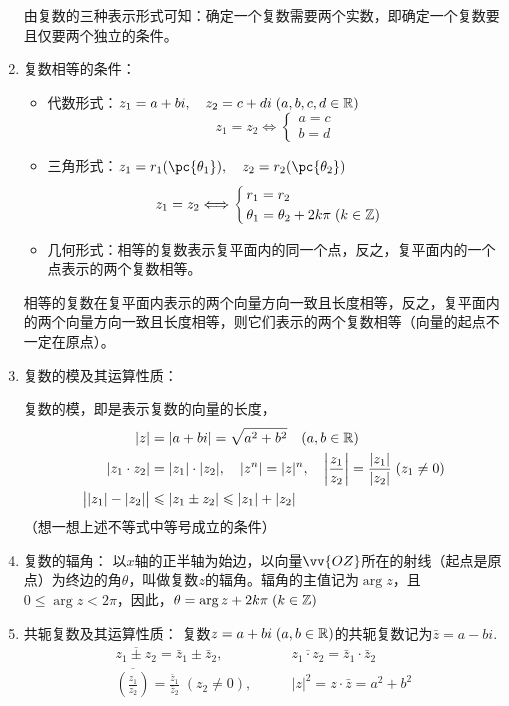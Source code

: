 \begin{enumerate}
由复数的三种表示形式可知：确定一个复数需要两个实数，即确定一个复数要且仅要两个独立的条件。
\item 复数相等的条件：
\begin{itemize}
    \item 代数形式：$z_1=a+bi,\quad z_2=c+di\; (a,b,c,d\in\mathbb{R})$
\[z_1=z_2\Longleftrightarrow \begin{cases}
    a=c\\ b=d
\end{cases}\]
\item 三角形式：$z_1=r_1(\pc{\theta_1}),\quad z_2=r_2(\pc{\theta_2})$
\[z_1=z_2\Longleftrightarrow \begin{cases}
    r_1=r_2\\ \theta_1=\theta_2+2k\pi\; (k\in\mathbb{Z})
\end{cases}\]
\item 几何形式：相等的复数表示复平面内的同一个点，反之，复平面内的一个点表示的两个复数相等。
\end{itemize}

相等的复数在复平面内表示的两个向量方向一致且长度相等，反之，复平面内的两个向量方向一致且长度相等，则它们表示的两个复数相等（向量的起点不一定在原点）。

\item 复数的模及其运算性质：

复数的模，即是表示复数的向量的长度，
\[\begin{split}
   |z|&=|a+bi| =\sqrt{a^2+b^2}\quad (a,b\in\mathbb{R})\\
    |z_1\cdot z_2|& =|z_1|\cdot |z_2|,\quad |z^n|=|z|^n,\quad \left|\dfrac{z_1}{z_2}\right|=\dfrac{|z_1|}{|z_2|}\; (z_1\ne 0)\\
   \big| |z_1|-|z_2| \big|& \leqslant |z_1\pm z_2|\leqslant |z_1|+|z_2|
\end{split}\]
（想一想上述不等式中等号成立的条件）
\item 复数的辐角：
以$x$轴的正半轴为始边，以向量$\vv{OZ}$所在的射线（起点是原点）为终边的角$\theta$，叫做复数$z$的辐角。辐角的主值记为$\arg z$，且$0\le \arg z<2\pi$，因此，$\theta=\arg z+2k\pi\; (k\in\mathbb{Z})$
\item 共轭复数及其运算性质：
复数$z=a+bi\; (a,b\in\mathbb{R})$的共轭复数记为$\bar z=a-bi$.
\[\begin{split}
    \overline{z_1\pm z_2}=\bar z_1\pm\bar z_2,&\qquad \overline{z_1\cdot z_2}=\bar z_1\cdot \bar z_2\\
    \overline{\left(\frac{z_1}{z_2}\right)}=\frac{\bar z_1}{\bar z_2}\; (z_2\ne 0),&\qquad |z|^2=z\cdot \bar z=a^2+b^2
\end{split}\]
\end{enumerate}

